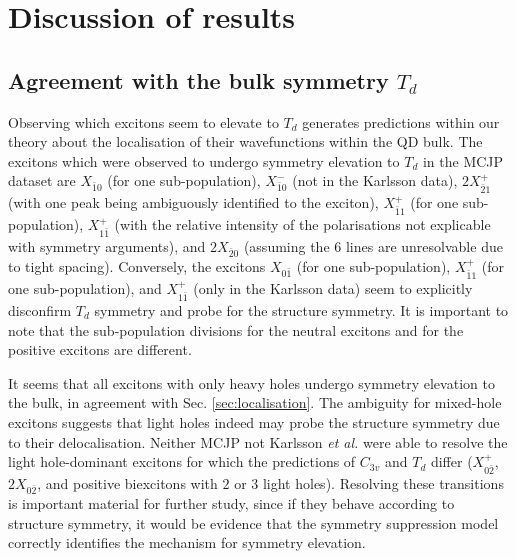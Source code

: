 \section{Discussion of results}


\subsection{Agreement with the bulk symmetry $T_d$}
Observing which excitons seem to elevate to $T_d$ generates predictions within our theory about the localisation of their wavefunctions within the QD bulk. The excitons which were observed to undergo symmetry elevation to $T_d$ in the MCJP dataset are $X_{\bar{1}0}$ (for one sub-population), $X^-_{\bar{1}0}$ (not in the Karlsson data), $2X^+_{\bar{2}1}$ (with one peak being ambiguously identified to the exciton), $X^+_{\bar{1}1}$ (for one sub-population),  $X^+_{1\bar{1}}$ (with the relative intensity of the polarisations not explicable with symmetry arguments), and $2X_{\bar{2}0}$ (assuming the $6$ lines are unresolvable due to tight spacing). Conversely, the excitons $X_{0\bar{1}}$ (for one sub-population), $X^+_{\bar{1}1}$ (for one sub-population), and $X^+_{1\bar{1}}$ (only in the Karlsson data) seem to explicitly disconfirm $T_d$ symmetry and probe for the structure symmetry. It is important to note that the sub-population divisions for the neutral excitons and for the positive excitons are different.

It seems that all excitons with only heavy holes undergo symmetry elevation to the bulk, in agreement with Sec. \ref{sec:localisation}. The ambiguity for mixed-hole excitons suggests that light holes indeed may probe the structure symmetry due to their delocalisation. Neither MCJP not Karlsson \textit{et al.} were able to resolve the light hole-dominant excitons for which the predictions of $C_{3v}$ and $T_d$ differ ($X^+_{0\bar{2}}$, $2X_{0\bar{2}}$, and positive biexcitons with $2$ or $3$ light holes). Resolving these transitions is important material for further study, since if they behave according to structure symmetry, it would be evidence that the symmetry suppression   model correctly identifies the mechanism for symmetry elevation.

